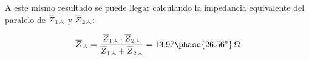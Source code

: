 \begin{enumerate}
  A este mismo resultado se puede llegar calculando la impedancia equivalente del paralelo de $\overline{Z}_{1\wye}$ y $\overline{Z}_{2\wye}$:

  \[
    \overline{Z}_{\wye} = \frac{\overline{Z}_{1\wye} \cdot \overline{Z}_{2\wye}}{\overline{Z}_{1\wye} + \overline{Z}_{2\wye}} = 13.97\phase{\ang{26.56}}\,\unit{\ohm}
  \]
\end{enumerate}

